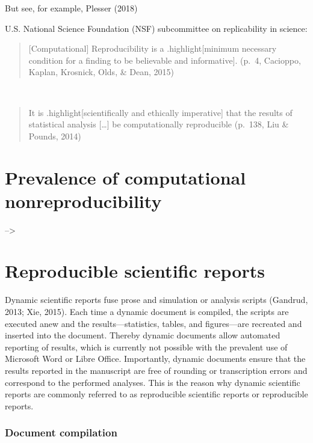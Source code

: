 \documentclass[man,floatsintext]{apa6}
\theoremstyle{definition}
\theoremstyle{definition}
\theoremstyle{definition}
\theoremstyle{remark}
\begin{document}
But see, for example, Plesser (2018)

U.S. National Science Foundation (NSF) subcommittee on replicability in
science:

\begin{quote}
{[}Computational{]} Reproducibility is a .highlight{[}minimum necessary
condition for a finding to be believable and informative{]}. (p.~4,
Cacioppo, Kaplan, Krosnick, Olds, \& Dean, 2015)
\end{quote}

~

\begin{quote}
It is .highlight{[}scientifically and ethically imperative{]} that the
results of statistical analysis {[}\ldots{}{]} be computationally
reproducible (p.~138, Liu \& Pounds, 2014)
\end{quote}

\section{Prevalence of computational
nonreproducibility}\label{prevalence-of-computational-nonreproducibility}

--\textgreater{}

\section{Reproducible scientific
reports}\label{reproducible-scientific-reports}

Dynamic scientific reports fuse prose and simulation or analysis scripts
(Gandrud, 2013; Xie, 2015). Each time a dynamic document is compiled,
the scripts are executed anew and the results---statistics, tables, and
figures---are recreated and inserted into the document. Thereby dynamic
documents allow automated reporting of results, which is currently not
possible with the prevalent use of Microsoft Word or Libre Office.
Importantly, dynamic documents ensure that the results reported in the
manuscript are free of rounding or transcription errors and correspond
to the performed analyses. This is the reason why dynamic scientific
reports are commonly referred to as reproducible scientific reports or
reproducible reports.

\hypertarget{document-compilation}{\subsubsection{Document
compilation}\label{document-compilation}}
\end{document}
